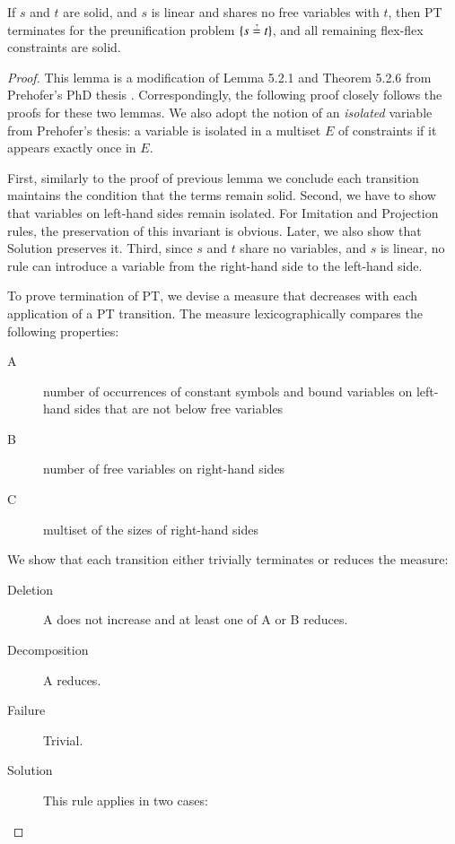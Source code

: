 \begin{lemma}
  \label{unif:lemma:solid-termination-preunif}
  If $s$ and $t$ are solid, and $s$ is linear and shares no free variables with $t$, then
  PT terminates for the preunification problem $\{ s \unif t \}$, and
  all remaining flex-flex constraints are solid.
\end{lemma}
\begin{proof}
  This lemma is a modification of Lemma 5.2.1 and Theorem 5.2.6 from Prehofer's
  PhD thesis \cite{cp-95-unifphd}. Correspondingly, the following proof closely
  follows the proofs for these two lemmas. We also adopt the notion of an
  \emph{isolated} variable from Prehofer's thesis: a variable is isolated in a
  multiset $E$ of constraints if it appears exactly once in $E$.

  First, similarly to the proof of previous lemma we conclude each transition
  maintains the condition that the terms remain solid. Second, we have to show
  that variables on left-hand sides remain isolated. For \textsf{Imitation} and
  \textsf{Projection} rules, the preservation of this invariant is obvious.
  Later, we also show that \textsf{Solution} preserves it. Third, since $s$ and
  $t$ share no variables, and $s$ is linear, no rule can introduce a variable
  from the right-hand side to the left-hand side.
  
  To prove termination of PT, we devise a measure that
  decreases with each application of a PT transition. The measure
  lexicographically compares the following properties:
  \begin{description}
    \item[A] number of occurrences of constant symbols and bound variables on left-hand sides that
    are not below free variables
    \item[B] number of free variables on right-hand sides
    \item[C] multiset of the sizes of right-hand sides
  \end{description}
  
  We show that each transition either trivially terminates or reduces the measure:
  \begin{description}
    \item[Deletion] A does not increase and at least one of A or B reduces.
    \item[Decomposition] A reduces.
    \item[Failure] Trivial. 
    \item[Solution] This rule applies in two cases:


\end{description}
\end{proof}
